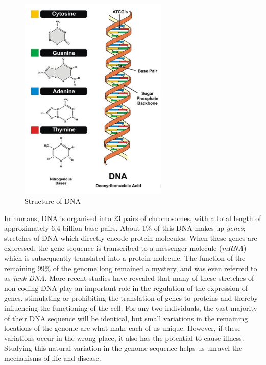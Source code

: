 \begin{figure}
    \centering
    \includegraphics[width=200pt]{chapters/images/introduction/dna-structure.png}
    \caption{Structure of DNA}\label{fig:dnastructure}
\end{figure}

In humans, DNA is organised into 23 pairs of chromosomes, with a total length of approximately 6.4 billion base pairs. About 1\% of this DNA makes up \emph{genes}; stretches of DNA which directly encode protein molecules. When these genes are expressed, the gene sequence is transcribed to a messenger molecule (\emph{mRNA}) which is subsequently translated into a protein molecule. The function of the remaining 99\% of the genome long remained a mystery, and was even referred to as \emph{junk DNA}. More recent studies have revealed that many of these stretches of non-coding DNA play an important role in the regulation of the expression of genes, stimulating or prohibiting the translation of genes to proteins and thereby influencing the functioning of the cell. For any two individuals, the vast majority of their DNA sequence will be identical, but small variations in the remaining locations of the genome are what make each of us unique. However, if these variations occur in the wrong place, it also has the potential to cause illness. Studying this natural variation in the genome sequence helps us unravel the mechanisms of life and disease.

